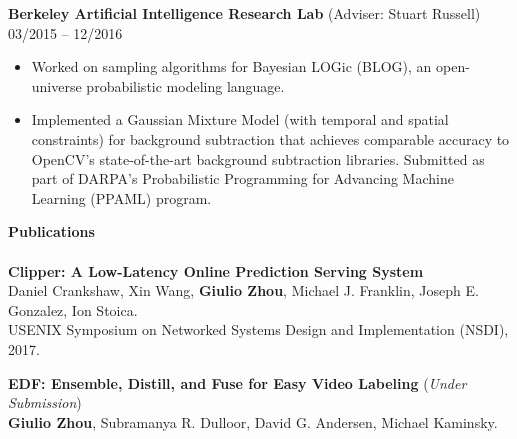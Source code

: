 \documentclass{article}
\begin{document}
\noindent
\textbf{Berkeley Artificial Intelligence Research Lab} (Adviser: Stuart Russell)
\hfill 03/2015 -- 12/2016
\begin{itemize}
\vspace{-2.5mm}
\item Worked on sampling algorithms for Bayesian LOGic (BLOG), an open-universe probabilistic modeling language.
\vspace{-6.5mm}
\item Implemented a Gaussian Mixture Model (with temporal and spatial constraints) for background subtraction that achieves comparable accuracy to OpenCV's
      state-of-the-art background subtraction libraries. Submitted as part of DARPA's Probabilistic Programming for Advancing Machine Learning (PPAML) program.
\end{itemize}
% 

\noindent
\textbf{\Large Publications}\\[-2mm]
\HRule\\
\noindent
\textbf{Clipper: A Low-Latency Online Prediction Serving System} \\
Daniel Crankshaw, Xin Wang, \textbf{Giulio Zhou}, Michael J. Franklin, Joseph E. Gonzalez, Ion Stoica. \\
USENIX Symposium on Networked Systems Design and Implementation (NSDI), 2017. \\
\vspace{-3mm}

\noindent
\textbf{EDF: Ensemble, Distill, and Fuse for Easy Video Labeling} (\textit{Under Submission}) \\
\textbf{Giulio Zhou}, Subramanya R. Dulloor, David G. Andersen, Michael Kaminsky. \\
\vspace{-3mm}
\end{document}
